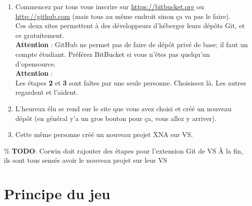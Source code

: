 \documentclass[a4paper]{article}
\begin{document}

\begin{enumerate}
    \item Commencez par tous vous inscrire sur \url{https://bitbucket.org} ou
    \url{http://github.com} (mais tous au même endroit sinon ça va pas le faire). \\
    Ces deux sites permettent à des développeurs d'héberger leurs dépôts Git, et ce
    gratuitement.\\
    \textbf{Attention} : GitHub ne permet pas de faire de dépôt privé
    de base; il faut un compte étudiant. Préférez BitBucket si vous n'êtes pas
    quelqu'un d'opensource.\\

    {\color{red} \textbf{Attention} : \\Les étapes \textbf{2} et \textbf{3}
    sont faîtes par une seule personne. Choisissez là. Les autres regardent et
    l'aident.}\\

    \item L'heureux élu se rend sur le site que vous avez choisi et créé un
    nouveau dépôt (en général y'a un gros bouton pour ça, vous allez y arriver). \\

    \item Cette même personne créé un nouveau projet XNA sur VS.
\end{enumerate}

\% \textbf{TODO}: Corwin doit rajouter des étapes pour l'extension Git de VS
À la fin, ils sont tous sensés avoir le nouveau projet sur leur VS

\section{Principe du jeu}
\end{document}
